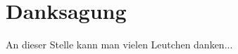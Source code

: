 \newpage
\thispagestyle{empty}
\section*{Danksagung}
An dieser Stelle kann man vielen Leutchen danken...
